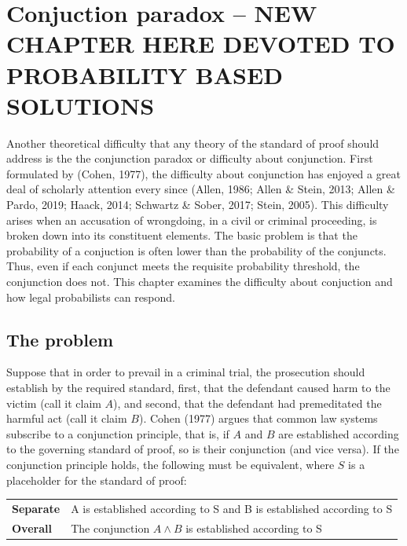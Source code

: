 \documentclass[10pt,dvipsnames,enabledeprecatedfontcommands]{scrartcl}
\newcommand{\et}{\wedge}
\begin{document}
\hypertarget{conjuction-paradox-new-chapter-here-devoted-to-probability-based-solutions}{%
\section{Conjuction paradox -- NEW CHAPTER HERE DEVOTED TO PROBABILITY
BASED
SOLUTIONS}\label{conjuction-paradox-new-chapter-here-devoted-to-probability-based-solutions}}

Another theoretical difficulty that any theory of the standard of proof
should address is the the conjunction paradox or difficulty about
conjunction. First formulated by (Cohen, 1977), the difficulty about
conjunction has enjoyed a great deal of scholarly attention every since
(Allen, 1986; Allen \& Stein, 2013; Allen \& Pardo, 2019; Haack, 2014;
Schwartz \& Sober, 2017; Stein, 2005). This difficulty arises when an
accusation of wrongdoing, in a civil or criminal proceeding, is broken
down into its constituent elements. The basic problem is that the
probability of a conjuction is often lower than the probability of the
conjuncts. Thus, even if each conjunct meets the requisite probability
threshold, the conjunction does not. This chapter examines the
difficulty about conjuction and how legal probabilists can respond.

\hypertarget{the-problem}{%
\subsection{The problem}\label{the-problem}}

Suppose that in order to prevail in a criminal trial, the prosecution
should establish by the required standard, first, that the defendant
caused harm to the victim (call it claim \(A\)), and second, that the
defendant had premeditated the harmful act (call it claim \(B\)). Cohen
(1977) argues that common law systems subscribe to a conjunction
principle, that is, if \(A\) and \(B\) are established according to the
governing standard of proof, so is their conjunction (and vice versa).
If the conjunction principle holds, the following must be equivalent,
where \(S\) is a placeholder for the standard of proof:

\begin{center}
\begin{tabular}
{@{}ll@{}}
\toprule
\textbf{Separate} &   A is established according to S and B is established according to S\\   
\textbf{Overall}  &   The conjunction $A \et B$ is established according to S  \\ 
\bottomrule
\end{tabular}
\end{center}
\end{document}

